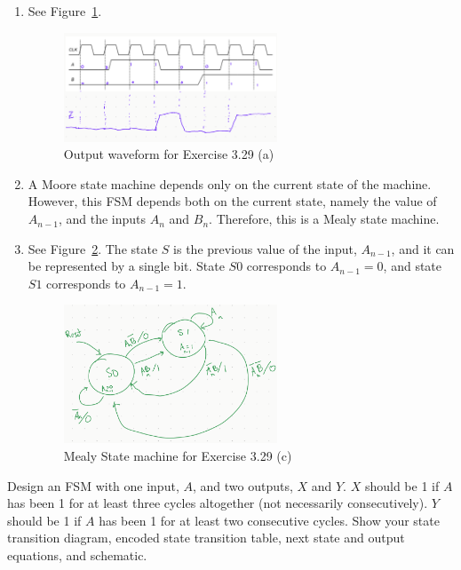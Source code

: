 \documentclass[12pt]{article}
\newenvironment{ex}[2][Exercise]{\begin{trivlist}
		\item[\hskip \labelsep {\bfseries #1}\hskip \labelsep {\bfseries #2.}]}{\end{trivlist}}
\newenvironment{sol}[1][Solution]{\begin{trivlist}
		\item[\hskip \labelsep {\bfseries #1:}]}{\end{trivlist}}
\begin{document}
\begin{sol}
	\begin{enumerate}[label=(\alph*)]
		\item See Figure~\ref{03-29-output-waveform}.
		\begin{figure}
			\centering
			\includegraphics[width=0.6\textwidth]{03-29-output-waveform}
			\caption{Output waveform for Exercise 3.29 (a)}
			\label{03-29-output-waveform}
		\end{figure}
		\item A Moore state machine depends only on the current state of the machine.
		However, this FSM depends both on the current state, namely the value of $A_{n-1}$,
		and the inputs $A_n$ and $B_n$. Therefore, this is a Mealy state machine.
		\item See Figure~\ref{03-29-state-machine}. The state $S$ is the previous
		value of the input, $A_{n-1}$, and it can be represented by a single bit.
		State $S0$ corresponds to $A_{n-1}=0$, and state $S1$ corresponds to $A_{n-1}=1$.
		\begin{figure}
			\centering
			\includegraphics[width=0.6\textwidth]{03-29-state-machine}
			\caption{Mealy State machine for Exercise 3.29 (c)}
			\label{03-29-state-machine}
		\end{figure}
	\end{enumerate}
\end{sol}

\begin{ex}{3.30}
	Design an FSM with one input, $A$, and two outputs, $X$ and $Y$. $X$ should be 1
	if $A$ has been 1 for at least three cycles altogether (not necessarily consecutively).
	$Y$ should be 1 if $A$ has been 1 for at least two consecutive cycles.
	Show your state transition diagram, encoded state transition table, next state
	and output equations, and schematic.
\end{ex}
\end{document}

